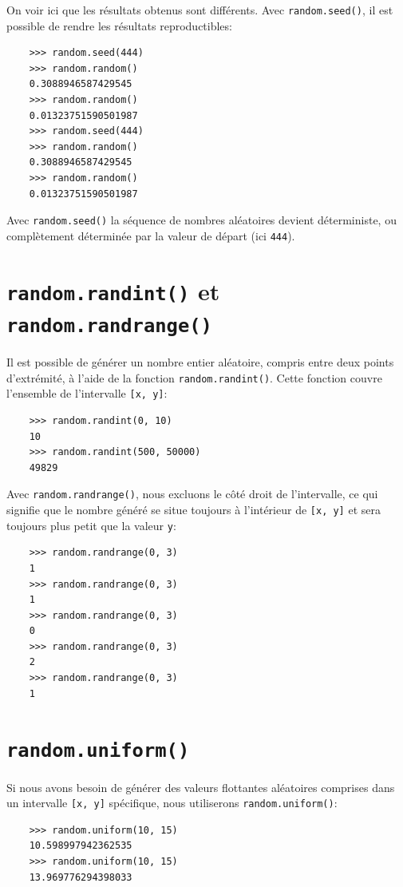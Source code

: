 \documentclass[a4paper,11pt]{book}
\begin{document}
On voir ici que les résultats obtenus sont différents. Avec \texttt{random.seed()}, il est possible de rendre les résultats reproductibles:
\begin{verbatim}
    >>> random.seed(444)
    >>> random.random()
    0.3088946587429545
    >>> random.random()
    0.01323751590501987
    >>> random.seed(444)
    >>> random.random()
    0.3088946587429545
    >>> random.random()
    0.01323751590501987
\end{verbatim}
\medskip

Avec \texttt{random.seed()} la séquence de nombres aléatoires devient déterministe, ou complètement déterminée par la valeur de départ (ici \texttt{444}).

\section{\texttt{random.randint()} et \texttt{random.randrange()}}
Il est possible de générer un nombre entier aléatoire, compris entre deux points d'extrémité, à l'aide de la fonction \texttt{random.randint()}. Cette fonction couvre l'ensemble de l'intervalle \texttt{[x, y]}:
\begin{verbatim}
    >>> random.randint(0, 10)
    10
    >>> random.randint(500, 50000)
    49829
\end{verbatim}
\medskip

Avec \texttt{random.randrange()}, nous excluons le côté droit de l'intervalle, ce qui signifie que le nombre généré se situe toujours à l'intérieur de \texttt{[x, y]} et sera toujours plus petit que la valeur \texttt{y}:
\begin{verbatim}
    >>> random.randrange(0, 3)
    1
    >>> random.randrange(0, 3)
    1
    >>> random.randrange(0, 3)
    0
    >>> random.randrange(0, 3)
    2
    >>> random.randrange(0, 3)
    1
\end{verbatim}
\medskip

\section{\texttt{random.uniform()}}
Si nous avons besoin de générer des valeurs flottantes aléatoires comprises dans un intervalle \texttt{[x, y]} spécifique, nous utiliserons \texttt{random.uniform()}:
\begin{verbatim}
    >>> random.uniform(10, 15)
    10.598997942362535
    >>> random.uniform(10, 15)
    13.969776294398033
\end{verbatim}
\end{document}
